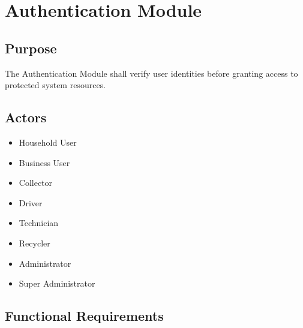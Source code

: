 \section{Authentication Module}
\label{sec:authentication-module}

\subsection{Purpose}

The Authentication Module shall verify user identities before granting
access to protected system resources.

\subsection{Actors}

\begin{itemize}

\item Household User

\item Business User

\item Collector

\item Driver

\item Technician

\item Recycler

\item Administrator

\item Super Administrator

\end{itemize}

\subsection{Functional Requirements}

